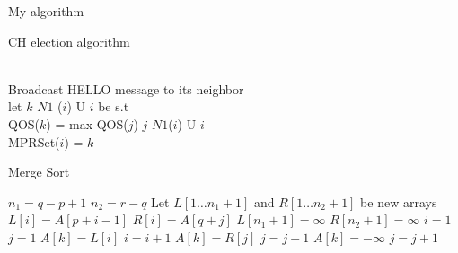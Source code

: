 \documentclass{article}
\makeatletter
\def\BState{\State\hskip-\ALG@thistlm}
\makeatother
\begin{document}
\begin{algorithm}
\caption{My algorithm}\label{euclid}
\end{algorithm}

\begin{algorithm}
    \caption{CH election algorithm}
    \label{CHalgorithm}
    \begin{algorithmic}[1]
         {}
        \\Broadcast HELLO message to its neighbor
        \\let $k$  $N1$ ($i$) U {$i$} be s.t
        \\QOS($k$) = max {QOS($j$) \textbar $j$  $N1$($i$)  U $i$}
        \\ MPRSet($i$) = $k$
        \EndFor
        \EndProcedure
    \end{algorithmic}
\end{algorithm}

\begin{algorithm}
\caption{Merge Sort}
\begin{algorithmic}[1]
    
    \State ${n_1} = q - p + 1$
    \State ${n_2} = r - q$
    \State Let $L[1 \ldots {n_1} + 1]$ and $R[1 \ldots {n_2} + 1]$ be new arrays
    \State $L[i] = A[p + i - 1]$
    \EndFor
    \State $R[i] = A[q + j]$
    \EndFor
    \State $L[{n_1} + 1] =  \infty $
    \State $R[{n_2} + 1] =  \infty $
    \State $i = 1$
    \State $j = 1$
    \State $A[k] = L[i]$
    \State $i = i + 1$
    \State $A[k] = R[j]$
    \State $j = j + 1$
    \Else
    \State $A[k] = - \infty$ 
    \State $j = j + 1$
    \EndIf
    \EndFor
    \EndFunction
    
\end{algorithmic}
\end{algorithm}
\end{document}
